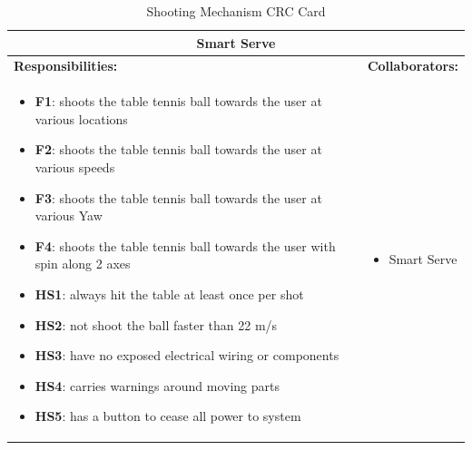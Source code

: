 \documentclass[11pt]{article}
\begin{document}
\begin{table}[H]
\centering
\label{my-label}
\begin{tabular}{ | p{} | p{} | }
\hline
\multicolumn{2}{|c|}{\textbf{Smart Serve}}             \\ \hline
\textbf{Responsibilities:} & \textbf{Collaborators:} \\ \hline
\begin{itemize}
\item \textbf{F1}: shoots the table tennis ball towards the user at various locations 
\item \textbf{F2}: shoots the table tennis ball towards the user at various speeds 
\item \textbf{F3}: shoots the table tennis ball towards the user at various Yaw
\item \textbf{F4}: shoots the table tennis ball towards the user with spin along 2 axes
\item \textbf{HS1}: always hit the table at least once per shot
\item \textbf{HS2}: not shoot the ball faster than 22 m/s
\item \textbf{HS3}: have no exposed electrical wiring or components
\item \textbf{HS4}: carries warnings around moving parts
\item \textbf{HS5}: has a button to cease all power to system
\end{itemize} 
&
\begin{itemize} 
\item Smart Serve
\end{itemize} \\ \hline
\end{tabular}
\caption{Shooting Mechanism CRC Card}
\end{table}
\end{document}
